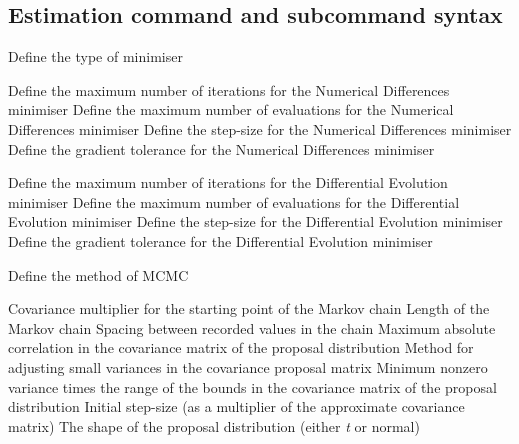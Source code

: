 \subsection{Estimation command and subcommand syntax}
\par
\par {}\par
{} {Define the type of minimiser}
\par\textbf{}\par
{} {Define the maximum number of iterations for the Numerical Differences minimiser}
 {Define the maximum number of evaluations for the Numerical Differences minimiser}
 {Define the step-size for the Numerical Differences minimiser}
 {Define the gradient tolerance for the Numerical Differences minimiser}
\par\textbf{}\par
{} {Define the maximum number of iterations for the Differential Evolution minimiser}
 {Define the maximum number of evaluations for the Differential Evolution minimiser}
 {Define the step-size for the Differential Evolution minimiser}
 {Define the gradient tolerance for the Differential Evolution minimiser}
\par {}\par
{} {Define the method of MCMC}
\par\textbf{}\par
{} {Covariance multiplier for the starting point of the Markov chain}
 {Length of the Markov chain}
 {Spacing between recorded values in the chain}
 {Maximum absolute correlation in the covariance matrix of the proposal distribution}
 {Method for adjusting small variances in the covariance proposal matrix}
 {Minimum nonzero variance times the range of the bounds in the covariance matrix of the proposal distribution}
 {Initial step-size (as a multiplier of the approximate covariance matrix)}
 {The shape of the proposal distribution (either \textit{t} or normal)}
